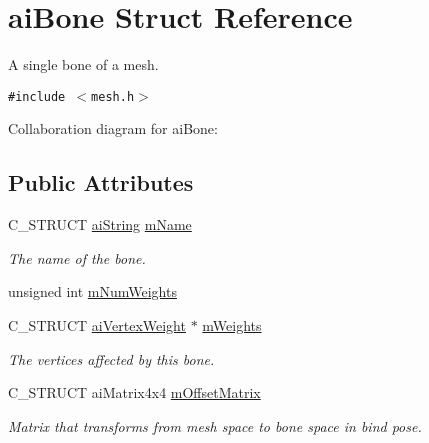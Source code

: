 \hypertarget{structai_bone}{
\section{aiBone Struct Reference}
\label{structai_bone}
}
A single bone of a mesh.  


{\tt \#include $<$mesh.h$>$}

Collaboration diagram for aiBone:\subsection*{Public Attributes}
\begin{CompactItemize}
\item 
\hypertarget{structai_bone_cfb9bfd2a2c6302181d7c3cc1bb8bbf0}{
C\_\-STRUCT \hyperlink{structai_string}{aiString} \hyperlink{structai_bone_cfb9bfd2a2c6302181d7c3cc1bb8bbf0}{mName}}
\label{structai_bone_cfb9bfd2a2c6302181d7c3cc1bb8bbf0}

\begin{CompactList}\small\item\em The name of the bone. \item\end{CompactList}\item 
unsigned int \hyperlink{structai_bone_87a79d42a0132753aac66397ad6f9b71}{mNumWeights}
\item 
\hypertarget{structai_bone_de36319714b58c03ad46aae30a2724a4}{
C\_\-STRUCT \hyperlink{structai_vertex_weight}{aiVertexWeight} $\ast$ \hyperlink{structai_bone_de36319714b58c03ad46aae30a2724a4}{mWeights}}
\label{structai_bone_de36319714b58c03ad46aae30a2724a4}

\begin{CompactList}\small\item\em The vertices affected by this bone. \item\end{CompactList}\item 
\hypertarget{structai_bone_1dd6c4f24a1384c05da281692be3e78d}{
C\_\-STRUCT aiMatrix4x4 \hyperlink{structai_bone_1dd6c4f24a1384c05da281692be3e78d}{mOffsetMatrix}}
\label{structai_bone_1dd6c4f24a1384c05da281692be3e78d}

\begin{CompactList}\small\item\em Matrix that transforms from mesh space to bone space in bind pose. \item\end{CompactList}\end{CompactItemize}



